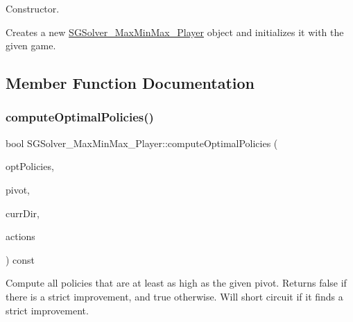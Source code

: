 Constructor. 

Creates a new \hyperlink{classSGSolver__MaxMinMax__3Player}{S\+G\+Solver\+\_\+\+Max\+Min\+Max\+\_\+Player} object and initializes it with the given game. 

\subsection{Member Function Documentation}
\mbox{\label{classSGSolver__MaxMinMax__3Player_ac4a619fc0fb7048614b82cf3c7acad15}} 
\subsubsection{\texorpdfstring{compute\+Optimal\+Policies()}{computeOptimalPolicies()}}
{\footnotesize\ttfamily bool S\+G\+Solver\+\_\+\+Max\+Min\+Max\+\_\+Player\+::compute\+Optimal\+Policies (\begin{DoxyParamCaption}\item[{\hyperlink{classSGProductPolicy}{S\+G\+Product\+Policy} \&}]{opt\+Policies,  }\item[{const \hyperlink{classSGTuple}{S\+G\+Tuple} \&}]{pivot,  }\item[{const \hyperlink{classSGPoint}{S\+G\+Point} \&}]{curr\+Dir,  }\item[{const vector$<$ list$<$ \hyperlink{classSGAction__MaxMinMax}{S\+G\+Action\+\_\+\+Max\+Min\+Max} $>$ $>$ \&}]{actions }\end{DoxyParamCaption}) const}

Compute all policies that are at least as high as the given pivot. Returns false if there is a strict improvement, and true otherwise. Will short circuit if it finds a strict improvement. \mbox{\label{classSGSolver__MaxMinMax__3Player_a749f42db5eedf73787c1beba3ac97c85}} 
